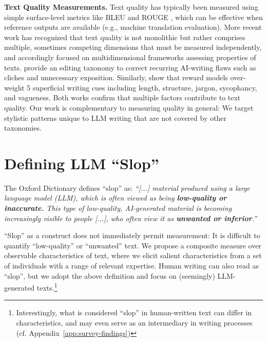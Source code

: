 \documentclass{article} %
\begin{document}
\textbf{Text Quality Measurements.} Text quality has typically been measured using simple surface-level metrics like BLEU \citep{papineni2002bleu} and ROUGE \citep{lin2004rouge}, which can be effective when reference outputs are available (e.g., machine translation evaluation).  
More recent work has recognized that text quality is not monolithic but rather comprises multiple, sometimes competing dimensions that must be measured independently, and accordingly focused on multidimensional frameworks assessing properties of texts. \citet{chakrabarty2025can} provide an editing taxonomy to correct \citep{chakrabarty2025ai} recurring AI-writing flaws such as cliches and unnecessary exposition. Similarly, \citet{bharadwaj2025flattery} show that reward models over-weight 5 superficial writing cues including length, structure, jargon, sycophancy, and vagueness. Both works confirm that multiple factors contribute to text quality. Our work is complementary to measuring quality in general: We  target stylistic patterns unique to LLM writing that are not covered by other taxonomies. 
 

\section{Defining LLM ``Slop''}
\label{sec:defn}
The Oxford Dictionary defines ``slop'' as:
    \textit{``[...] material produced using a large language model (LLM), which is often viewed as being \textbf{low-quality or inaccurate.} This type of low-quality, AI-generated material is becoming increasingly visible to people [...], who often view it as \textbf{unwanted or inferior}.''} 
    
``Slop'' as a construct does not immediately permit measurement: It is difficult to quantify ``low-quality'' or ``unwanted'' text. 
We propose a composite measure over observable characteristics of text, where we elicit salient characteristics from a set of individuals with a range of relevant expertise.  
Human writing can also read as ``slop'',  but we adopt the above definition and focus on (seemingly) LLM-generated texts.\footnote{Interestingly, what is considered ``slop'' in human-written text can differ in characteristics, and may even serve as an intermediary in writing processes (cf. Appendix~\ref{app:survey-findings})} 
\end{document}
